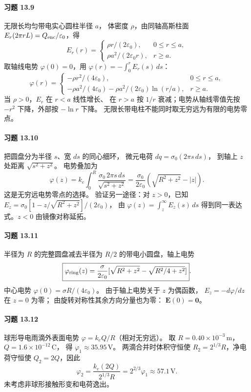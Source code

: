 \paragraph{习题 13.9}
无限长均匀带电实心圆柱半径 \(a\)，
体密度 \(\rho\)，由同轴高斯柱面
\(E_r(2\pi rL)=Q_{\rm enc}/\varepsilon_0\)，得
\[
 \boxed{E_r(r)=
 \begin{cases}
 \rho r/(2\varepsilon_0),&0\le r\le a,\\
 \rho a^2/(2\varepsilon_0r),&r\ge a.
 \end{cases}}
\]
取轴线电势 \(\varphi(0)=0\)，用
\(\varphi(r)=-\int_0^rE_r(s)\,ds\)：
\[
 \boxed{\varphi(r)=
 \begin{cases}
 -\rho r^2/(4\varepsilon_0),&0\le r\le a,\\
 -\rho a^2/(4\varepsilon_0)
 -\rho a^2/(2\varepsilon_0)\ln(r/a),&r\ge a.
 \end{cases}}
\]
当 \(\rho>0\)，\(E_r\) 在 \(r<a\) 线性增长、
在 \(r>a\) 按 \(1/r\) 衰减；电势从轴线零值先按
\(-r^2\) 下降，外部按 \(-\ln r\) 下降。
无限长带电柱不能同时取无穷远为有限的电势零点。

\paragraph{习题 13.10}
把圆盘分为半径 \(s\)、宽 \(ds\) 的同心细环，
微元电荷 \(dq=\sigma_0(2\pi s\,ds)\)，
到轴上 \(z\) 处距离
\(\sqrt{s^2+z^2}\)。
电势叠加为
\[
 \varphi(z)=k_e\int_0^R
 \frac{\sigma_0\,2\pi s\,ds}{\sqrt{s^2+z^2}}
 =\boxed{\frac{\sigma_0}{2\varepsilon_0}
 (\sqrt{R^2+z^2}-|z|)}.
\]
这是无穷远电势零点的选择。
验证另一途径：对 \(z>0\)，已知
\(E_z=\sigma_0[1-z/\sqrt{R^2+z^2}]/(2\varepsilon_0)\)，
由 \(\varphi(z)=\int_z^\infty E_z(s)\,ds\)
得到同一表达式。\(z<0\) 由镜像对称延拓。

\paragraph{习题 13.11}
半径为 \(R\) 的完整圆盘减去半径为 \(R/2\)
的带电小圆盘，轴上电势
\[
 \boxed{\varphi_{\rm ring}(z)=
 \frac{\sigma}{2\varepsilon_0}
 [\sqrt{R^2+z^2}-\sqrt{R^2/4+z^2}]}.
\]
中心电势
\(\boxed{\varphi(0)=\sigma R/(4\varepsilon_0)}\)。
由于轴上电势关于 \(z\) 为偶函数，
\(E_z=-d\varphi/dz\) 在 \(z=0\) 为零；
由旋转对称性其余方向分量也为零：
\(\boxed{\boldsymbol E(0)=\boldsymbol0}\)。

\paragraph{习题 13.12}
球形导电雨滴外表面电势
\(\varphi=k_eQ/R\)（相对无穷远）。
取 \(R=0.40\times10^{-3}\,\mathrm m\)，
\(Q=1.6\times10^{-12}\,\mathrm C\)，
得
\(\boxed{\varphi_1\approx35.95\,\mathrm V}\)。
两滴合并时体积守恒使
\(R_2=2^{1/3}R\)，净电荷守恒使
\(Q_2=2Q\)，因此
\[
 \boxed{\varphi_2=\frac{k_e(2Q)}{2^{1/3}R}
 =2^{2/3}\varphi_1\approx57.1\,\mathrm V}.
\]
未考虑非球形接触形变和电荷逸出。

